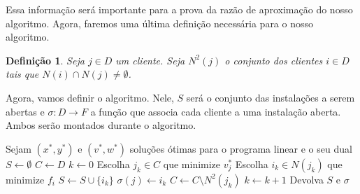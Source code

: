 \documentclass[12pt]{article}
\newtheorem{definition}[theorem]{Definição}
\begin{document}
Essa informação será importante para a prova da razão de aproximação do nosso algoritmo. Agora, faremos uma última definição necessária para o nosso algoritmo.

\begin{definition}
    Seja $j\in D$ um cliente. Seja $N^2(j)$ o conjunto dos clientes $i \in D$ tais que $N(i) \cap N(j) \neq \emptyset$.
\end{definition}
Agora, vamos definir o algoritmo. Nele, $S$ será o conjunto das instalações a serem abertas e $\sigma : D \rightarrow F $ a função que associa cada cliente a uma instalação aberta. Ambos serão montados durante o algoritmo.
\begin{algorithm}
    \begin{algorithmic}[1]
        \State Sejam $(x^*,y^*)$ e $(v^*,w^*)$ soluções ótimas para o programa linear e o seu dual
        \State $S \gets \emptyset$
        \State $C \gets D$ 
        \State $k \gets 0$
        \State Escolha $j_k \in C$ que minimize $v_j^*$
        \State Escolha $i_k \in N(j_k)$ que minimize $f_{i}$
        \State $S \gets S \cup \{i_k\}$
        \State $\sigma(j) \leftarrow i_k$
        \EndFor
        \State $C \gets C \setminus N^2(j_k)$
        \State $k \gets k+1$
        \EndWhile
        \State Devolva $S$ e $\sigma$
        \EndFunction
    \end{algorithmic}
\end{algorithm}
\end{document}
